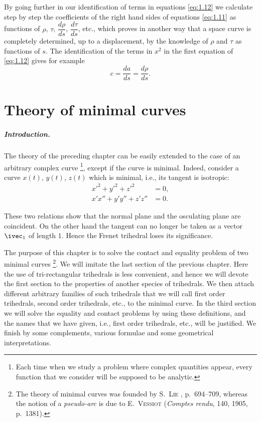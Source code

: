 By going further in our identification of terms in equations \eqref{eq:1.12} we calculate step by step the coefficients of the right hand sides of equations \eqref{eq:1.11} as functions of $\rho$, $\tau$, $\dfrac{d\rho}{ds}$, $\dfrac{d\tau}{ds}$, etc., which proves in another way that a space curve is completely determined, up to a displacement, by the knowledge of $\rho$ and $\tau$ as functions of $s$. The identification of the terms in $x^{2}$ in the first equation of \eqref{eq:1.12} gives for example
\[
c=\frac{da}{ds}=\frac{d\rho}{ds}.
\]

\chapter{Theory of minimal curves}
\label{cha:theory-minim-curv}

\paragraph{Introduction.}
\label{sec:22}
The theory of the preceding chapter can be easily extended to the case of an arbitrary complex curve \footnote{Each time when we study a problem where complex quantities appear, every function that we consider will be supposed to be analytic.}, except if the curve is minimal. Indeed, consider a curve $x(t)$, $y(t)$, $z(t)$ which is minimal, i.e., its tangent is isotropic:
\begin{align}
  \label{eq:2.1}
  x'^{2}+y'^{2}+z'^{2}&=0,\\
  x'x''+y'y''+z'z''&=0.
  \label{eq:2.2}
\end{align}

These two relations show that the normal plane and the osculating plane are coincident. On the other hand the tangent can no longer be taken as a vector $\ivec_{1}$ of length $1$. Hence the Frenet trihedral loses its significance.

The purpose of this chapter is to solve the contact and equality problem of two minimal curves \footnote{The theory of minimal curves was founded by \textsc{S.~Lie} \cite{4}, p.~694--709, whereas the notion of a \emph{pseudo-arc} is due to \textsc{E.~Vessiot} (\emph{Comptes rendu}, 140, 1905, p.~1381).}. We will imitate the last section of the previous chapter. Here the use of tri-rectangular trihedrals is less convenient, and hence we will devote the first section to the properties of another species of trihedrals. We then attach different arbitrary families of such trihedrals that we will call first order trihedrals, second order trihedrals, etc., to the minimal curve. In the third section we will solve the equality and contact problems by using these definitions, and the names that we have given, i.e., first order trihedrals, etc., will be justified. We finish by some complements, various formulae and some geometrical interpretations.

